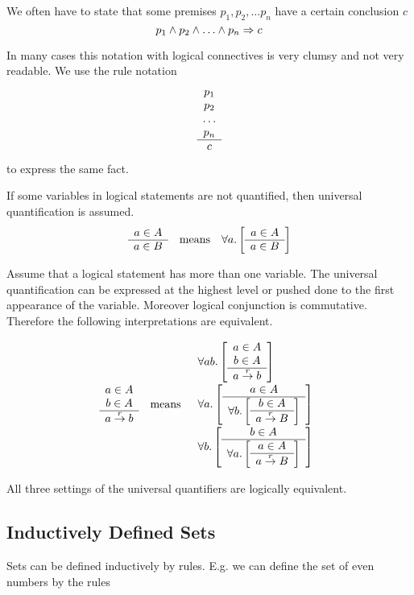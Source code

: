 We often have to state that some premises $p_1, p_2, \ldots p_n$ have a certain
conclusion $c$
$$
p_1 \land p_2 \land \ldots \land p_n \Rightarrow c
$$

In many cases this notation with logical connectives is very clumsy and not very
readable. We use the rule notation
$$
\begin{array}{c} p_1 \\ p_2 \\ \ldots \\ p_n \\ \hline c\end{array}
$$
to express the same fact.


If some variables in logical statements are not quantified, then universal
quantification is assumed.
$$
\begin{array}{ccc}

    \ruleh{a \in A}{a \in B}
    &
    \text{means}
    &
    \allbracket a {\ruleh {a \in A}{a \in B}}

\end{array}
$$

Assume that a logical statement has more than one variable. The universal
quantification can be expressed at the highest level or pushed done to the first
appearance of the variable. Moreover logical conjunction is commutative.
Therefore the following interpretations are equivalent.

$$
\begin{array}{ccc}
    \begin{array}{c} a \in A \\ b \in A \\ \hline a \stackrel{r}{\to} b\end{array}
    &
    \text{means}
    &
    \begin{array}{l}
        \forall ab. \left[ \begin{array}{c} a \in A \\ b \in A \\ \hline a \stackrel{r}{\to} b\end{array} \right]
        \\
        \forall a. \left[ 
            \begin{array}{c} a \in A \\ \hline \forall b. \left[ \begin{array}{c} b \in A \\ \hline a \stackrel{r}{\to} B\end{array} \right]\end{array}
         \right]
        \\
        \forall b. \left[ 
            \begin{array}{c} b \in A \\ \hline \forall a. \left[ \begin{array}{c} a \in A \\ \hline a \stackrel{r}{\to} B\end{array} \right]\end{array}
         \right]
    \end{array}
\end{array}
$$

All three settings of the universal quantifiers are logically equivalent.




\subsection{Inductively Defined Sets}

Sets can be defined inductively by rules. E.g. we can define the set of even
numbers by the rules

